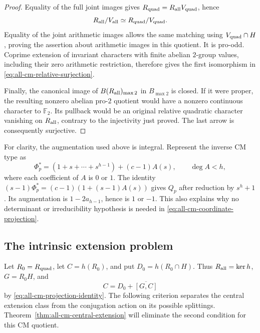 \begin{proof}
Equality of the full joint images gives
\(R_{\rm quad}=R_{\rm all}V_{\rm quad}\), hence
\[
 R_{\rm all}/V_{\rm all}\simeq R_{\rm quad}/V_{\rm quad}.
\]
Equality of the joint arithmetic images allows the same
matching using \(V_{\rm quad}\cap H\), proving the
assertion about arithmetic images in this quotient.
It is pro-odd. Coprime extension of invariant
characters with finite abelian \(2\)-group values,
including their zero arithmetic restriction, therefore
gives the first isomorphism in
\eqref{eq:all-cm-relative-surjection}.

Finally, the canonical image of
\(B(R_{\rm all})_{\max2}\) in \(B_{\max2}\) is closed.
If it were proper, the resulting nonzero abelian
pro-\(2\) quotient would have a nonzero continuous
character to \(\mathbb F_2\). Its pullback would be
an original relative quadratic character vanishing
on \(R_{\rm all}\), contrary to the injectivity just
proved. The last arrow is consequently surjective.
\end{proof}

For clarity, the augmentation used above is integral.
Represent the inverse CM type as
\[
 \Phi_p^*=(1+s+\cdots+s^{h-1})+(c-1)A(s),
 \qquad\deg A<h,
\]
where each coefficient of \(A\) is \(0\) or \(1\).
The identity
\((s-1)\Phi_p^*=(c-1)(1+(s-1)A(s))\)
gives \(Q_p\) after reduction by \(s^h+1\).
Its augmentation is \(1-2a_{h-1}\), hence is \(1\)
or \(-1\). This also explains why no determinant
or irreducibility hypothesis is needed in
\eqref{eq:all-cm-coordinate-projection}.

\subsection{The intrinsic extension problem}

Let \(R_0=R_{\rm quad}\), let \(C=h(R_0)\), and put
\(D_0=h(R_0\cap H)\). Thus \(R_{\rm all}=\ker h\),
\(G=R_0H\), and
\[
 C=D_0+\overline{[G,C]}
\]
by \eqref{eq:all-cm-projection-identity}.
The following criterion separates the central extension class
from the conjugation action on its possible splittings.
Theorem~\ref{thm:all-cm-central-extension} will eliminate
the second condition for this CM quotient.

